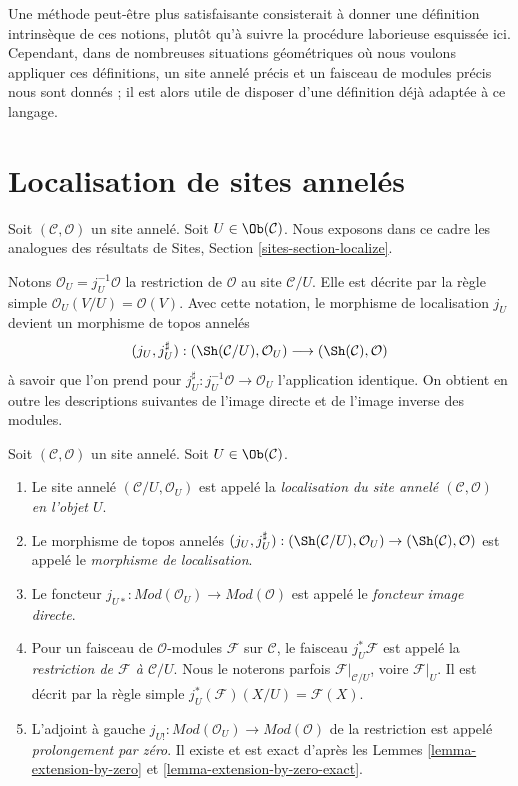 \medskip\noindent
Une méthode peut-être plus satisfaisante consisterait à donner une définition
intrinsèque de ces notions, plutôt qu'à suivre la procédure laborieuse esquissée
ici. Cependant, dans de nombreuses situations géométriques où nous voulons
appliquer ces définitions, un site annelé précis et un faisceau de modules précis
nous sont donnés ; il est alors utile de disposer d'une définition déjà adaptée
à ce langage.
\section{Localisation de sites annelés}
\label{section-localize}

\noindent
Soit $(\mathcal{C}, \mathcal{O})$ un site annelé.
Soit $U \in \Ob(\mathcal{C})$.
Nous exposons dans ce cadre les analogues des résultats de
Sites, Section \ref{sites-section-localize}.

\medskip\noindent
Notons
$\mathcal{O}_U = j_U^{-1}\mathcal{O}$ la restriction de $\mathcal{O}$
au site $\mathcal{C}/U$. Elle est décrite par la règle simple
$\mathcal{O}_U(V/U) = \mathcal{O}(V)$. Avec cette notation,
le morphisme de localisation $j_U$ devient un morphisme de topos annelés
$$
(j_U, j_U^\sharp) :
(\Sh(\mathcal{C}/U), \mathcal{O}_U)
\longrightarrow
(\Sh(\mathcal{C}), \mathcal{O})
$$
à savoir que l'on prend pour
$j_U^\sharp : j_U^{-1}\mathcal{O} \to \mathcal{O}_U$
l'application identique.
On obtient en outre les descriptions suivantes de l'image directe
et de l'image inverse des modules.

\begin{definition}
\label{definition-localize-ringed-site}
Soit $(\mathcal{C}, \mathcal{O})$ un site annelé.
Soit $U \in \Ob(\mathcal{C})$.
\begin{enumerate}
\item Le site annelé $(\mathcal{C}/U, \mathcal{O}_U)$ est appelé la
{\it localisation du site annelé $(\mathcal{C}, \mathcal{O})$
en l'objet $U$}.
\item Le morphisme de topos annelés
$(j_U, j_U^\sharp) :
(\Sh(\mathcal{C}/U), \mathcal{O}_U)
\to
(\Sh(\mathcal{C}), \mathcal{O})$
est appelé le {\it morphisme de localisation}.
\item Le foncteur
$j_{U*} : \textit{Mod}(\mathcal{O}_U) \to \textit{Mod}(\mathcal{O})$
est appelé le {\it foncteur image directe}.
\item Pour un faisceau de $\mathcal{O}$-modules $\mathcal{F}$ sur $\mathcal{C}$,
le faisceau $j_U^*\mathcal{F}$ est appelé la
{\it restriction de $\mathcal{F}$ à $\mathcal{C}/U$}.
Nous le noterons parfois
$\mathcal{F}|_{\mathcal{C}/U}$, voire $\mathcal{F}|_U$.
Il est décrit par la règle simple
$j_U^*(\mathcal{F})(X/U) = \mathcal{F}(X)$.
\item L'adjoint à gauche
$j_{U!} : \textit{Mod}(\mathcal{O}_U) \to \textit{Mod}(\mathcal{O})$
de la restriction est appelé {\it prolongement par zéro}. Il existe et est
exact d'après les
Lemmes \ref{lemma-extension-by-zero} et
\ref{lemma-extension-by-zero-exact}.
\end{enumerate}
\end{definition}

